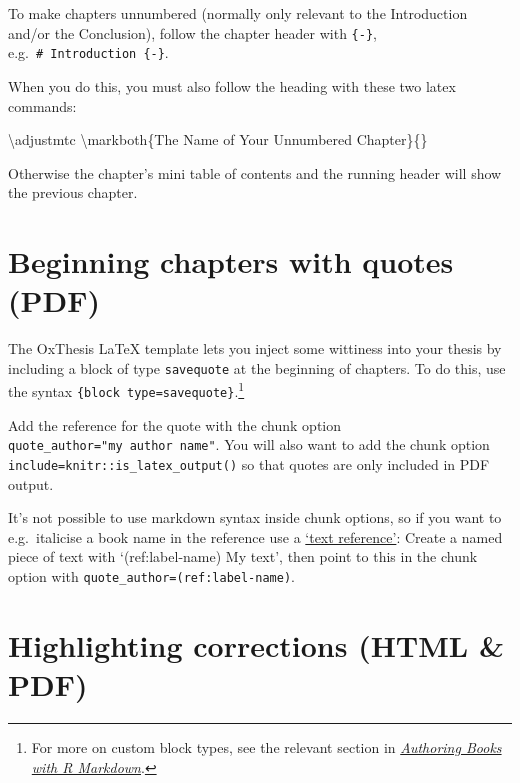 \documentclass[a4paper, nobind]{templates/ociamthesis}
\newenvironment{Shaded}{\begin{snugshade}}{\end{snugshade}}
\newcommand{\FunctionTok}[1]{\textcolor[rgb]{0.00,0.00,0.00}{#1}}
\newcommand{\NormalTok}[1]{#1}
\renewenvironment{Shaded}
{
  \vspace{10pt}%
  \begin{snugshade}%
}{%
  \end{snugshade}%
  \vspace{8pt}%
}
\begin{document}
To make chapters unnumbered (normally only relevant to the Introduction and/or the Conclusion), follow the chapter header with \texttt{\{-\}}, e.g.~\texttt{\#\ Introduction\ \{-\}}.

When you do this, you must also follow the heading with these two latex commands:

\begin{Shaded}
\begin{Highlighting}[]
\FunctionTok{\textbackslash{}adjustmtc}
\FunctionTok{\textbackslash{}markboth}\NormalTok{\{The Name of Your Unnumbered Chapter\}\{\}}
\end{Highlighting}
\end{Shaded}

Otherwise the chapter's mini table of contents and the running header will show the previous chapter.

\hypertarget{beginning-chapters-with-quotes-pdf}{%
\section{Beginning chapters with quotes (PDF)}\label{beginning-chapters-with-quotes-pdf}}

The OxThesis LaTeX template lets you inject some wittiness into your thesis by including a block of type \texttt{savequote} at the beginning of chapters.
To do this, use the syntax \texttt{\textasciigrave{}\textasciigrave{}\textasciigrave{}\{block\ type=\textquotesingle{}savequote\textquotesingle{}\}}.\footnote{For more on custom block types, see the relevant section in \href{https://bookdown.org/yihui/bookdown/custom-blocks.html}{\emph{Authoring Books with R Markdown}}.}

Add the reference for the quote with the chunk option \texttt{quote\_author="my\ author\ name"}.
You will also want to add the chunk option \texttt{include=knitr::is\_latex\_output()} so that quotes are only included in PDF output.

It's not possible to use markdown syntax inside chunk options, so if you want to e.g.~italicise a book name in the reference use a \href{https://bookdown.org/yihui/bookdown/markdown-extensions-by-bookdown.html\#text-references}{`text reference'}: Create a named piece of text with `(ref:label-name) My text', then point to this in the chunk option with \texttt{quote\_author=\textquotesingle{}(ref:label-name)\textquotesingle{}}.

\hypertarget{highlighting-corrections-html-pdf}{%
\section{Highlighting corrections (HTML \& PDF)}\label{highlighting-corrections-html-pdf}}
\end{document}
